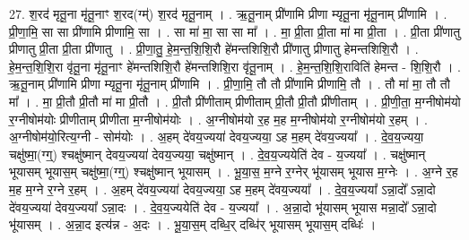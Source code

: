 \documentclass[17pt]{extarticle}
\begin{document}
27. श॒रद॑ मृतू॒ना मृ॑तू॒नाꣳ श॒रद(ग्म्॑) श॒रद॑ मृतू॒नाम् । . ऋ॒तू॒नाम् प्री॑णामि प्रीणा म्यृतू॒ना मृ॑तू॒नाम् प्री॑णामि । . प्री॒णा॒मि॒ सा सा प्री॑णामि प्रीणामि॒ सा । . सा मा॑ मा॒ सा सा मा᳚ । . मा॒ प्री॒ता प्री॒ता मा॑ मा प्री॒ता । . प्री॒ता प्री॑णातु प्रीणातु प्री॒ता प्री॒ता प्री॑णातु । . प्री॒णा॒तु॒ हे॒म॒न्त॒शि॒शि॒रौ हे॑मन्तशिशि॒रौ प्री॑णातु प्रीणातु हेमन्तशिशि॒रौ । . हे॒म॒न्त॒शि॒शि॒रा वृ॑तू॒ना मृ॑तू॒नाꣳ हे॑मन्तशिशि॒रौ हे॑मन्तशिशि॒रा वृ॑तू॒नाम् । . हे॒म॒न्त॒शि॒शि॒राविति॑ हेमन्त - शि॒शि॒रौ । . ऋ॒तू॒नाम् प्री॑णामि प्रीणा म्यृतू॒ना मृ॑तू॒नाम् प्री॑णामि । . प्री॒णा॒मि॒ तौ तौ प्री॑णामि प्रीणामि॒ तौ । . तौ मा॑ मा॒ तौ तौ मा᳚ । . मा॒ प्री॒तौ प्री॒तौ मा॑ मा प्री॒तौ । . प्री॒तौ प्री॑णीताम् प्रीणीताम् प्री॒तौ प्री॒तौ प्री॑णीताम् । . प्री॒णी॒ता॒ म॒ग्नीषोम॑यो र॒ग्नीषोम॑योः प्रीणीताम् प्रीणीता म॒ग्नीषोम॑योः । . अ॒ग्नीषोम॑यो र॒ह म॒ह म॒ग्नीषोम॑यो र॒ग्नीषोम॑यो र॒हम् । . अ॒ग्नीषोम॑यो॒रित्य॒ग्नी - सोम॑योः । . अ॒हम् दे॑वय॒ज्यया॑ देवय॒ज्यया॒ ऽह म॒हम् दे॑वय॒ज्यया᳚ । . दे॒व॒य॒ज्यया॒ चक्षु॑ष्मा॒(ग्ग्॒) श्चक्षु॑ष्मान् देवय॒ज्यया॑ देवय॒ज्यया॒ चक्षु॑ष्मान् । . दे॒व॒य॒ज्ययेति॑ देव - य॒ज्यया᳚ । . चक्षु॑ष्मान् भूयासम् भूयास॒म् चक्षु॑ष्मा॒(ग्ग्॒) श्चक्षु॑ष्मान् भूयासम् । . भू॒या॒स॒ म॒ग्ने र॒ग्नेर् भू॑यासम् भूयास म॒ग्नेः । . अ॒ग्ने र॒ह म॒ह म॒ग्ने र॒ग्ने र॒हम् । . अ॒हम् दे॑वय॒ज्यया॑ देवय॒ज्यया॒ ऽह म॒हम् दे॑वय॒ज्यया᳚ । . दे॒व॒य॒ज्यया᳚ ऽन्ना॒दो᳚ ऽन्ना॒दो दे॑वय॒ज्यया॑ देवय॒ज्यया᳚ ऽन्ना॒दः । . दे॒व॒य॒ज्ययेति॑ देव - य॒ज्यया᳚ । . अ॒न्ना॒दो भू॑यासम् भूयास मन्ना॒दो᳚ ऽन्ना॒दो भू॑यासम् । . अ॒न्ना॒द इत्य॑न्न - अ॒दः । . भू॒या॒स॒म् दब्धि॒र् दब्धि॑र् भूयासम् भूयास॒म् दब्धिः॑ । \newline
\end{document}
